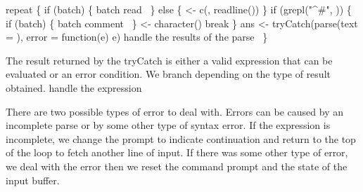 \documentclass[a4paper]{article}%
\begin{document}
\nwenddocs{}\endmoddef\nwstartdeflinemarkup{}\nwenddeflinemarkup
repeat \{
    if (batch) \{
        \LA{}batch read~{\nwtagstyle{}}\RA{}
    \} else \{
         <- c(, readline())
    \}
    if (grepl("^#", )) \{
        if (batch) \{
            \LA{}batch comment~{\nwtagstyle{}}\RA{}
        \}
         <- character()
        break
    \}
    ans <- tryCatch(parse(text = ), error = function(e) e)
    \LA{}handle the results of the parse~{\nwtagstyle{}}\RA{}
\}
\nwendcode{}\nwdocspar


The result returned by the {\Tt{}tryCatch\nwendquote} is either a valid
expression that can be evaluated or an error condition. We branch
depending on the type of result obtained.
\nwenddocs{}\endmoddef\nwstartdeflinemarkup{}\nwenddeflinemarkup
\LA{}handle the expression~{\nwtagstyle{}}\RA{}
\nwendcode{}\nwdocspar

There are two possible types of error to deal with.  Errors can be
caused by an incomplete parse or by some other type of syntax error.
If the expression is incomplete, we change the prompt to indicate
continuation and return to the top of the loop to fetch another line
of input.  If there was some other type of error, we deal with
the error then we reset the command
prompt and the state of the input buffer.
\end{document}
